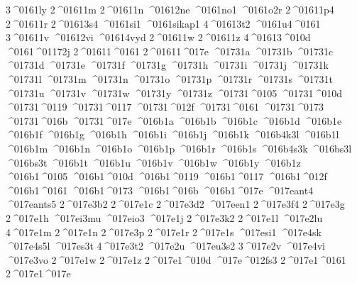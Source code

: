 {3^^^^0161ly
2^^^^01611m
2^^^^01611n
^^^^01612ne
^^^^0161no1
^^^^0161o2r
2^^^^01611p4
2^^^^01611r
2^^^^01613s4
^^^^0161si1
^^^^0161sikap1
4^^^^01613t2
^^^^0161u4^^^^0161
3^^^^01611v
^^^^01612vi
^^^^01614vyd
2^^^^01611w
2^^^^01611z
4^^^^01613^^^^010d
^^^^0161^^^^01172j
2^^^^01611^^^^0161
2^^^^01611^^^^017e
^^^^01731a
^^^^01731b
^^^^01731c
^^^^01731d
^^^^01731e
^^^^01731f
^^^^01731g
^^^^01731h
^^^^01731i
^^^^01731j
^^^^01731k
^^^^01731l
^^^^01731m
^^^^01731n
^^^^01731o
^^^^01731p
^^^^01731r
^^^^01731s
^^^^01731t
^^^^01731u
^^^^01731v
^^^^01731w
^^^^01731y
^^^^01731z
^^^^01731^^^^0105
^^^^01731^^^^010d
^^^^01731^^^^0119
^^^^01731^^^^0117
^^^^01731^^^^012f
^^^^01731^^^^0161
^^^^01731^^^^0173
^^^^01731^^^^016b
^^^^01731^^^^017e
^^^^016b1a
^^^^016b1b
^^^^016b1c
^^^^016b1d
^^^^016b1e
^^^^016b1f
^^^^016b1g
^^^^016b1h
^^^^016b1i
^^^^016b1j
^^^^016b1k
^^^^016b4k3l
^^^^016b1l
^^^^016b1m
^^^^016b1n
^^^^016b1o
^^^^016b1p
^^^^016b1r
^^^^016b1s
^^^^016b4s3k
^^^^016bs3l
^^^^016bs3t
^^^^016b1t
^^^^016b1u
^^^^016b1v
^^^^016b1w
^^^^016b1y
^^^^016b1z
^^^^016b1^^^^0105
^^^^016b1^^^^010d
^^^^016b1^^^^0119
^^^^016b1^^^^0117
^^^^016b1^^^^012f
^^^^016b1^^^^0161
^^^^016b1^^^^0173
^^^^016b1^^^^016b
^^^^016b1^^^^017e
^^^^017eant4
^^^^017eants5
2^^^^017e3b2
2^^^^017e1c
2^^^^017e3d2
^^^^017een1
2^^^^017e3f4
2^^^^017e3g
2^^^^017e1h
^^^^017ei3mu
^^^^017eio3
^^^^017e1j
2^^^^017e3k2
2^^^^017e1l
^^^^017e2lu
4^^^^017e1m
2^^^^017e1n
2^^^^017e3p
2^^^^017e1r
2^^^^017e1s
^^^^017esi1
^^^^017e4sk
^^^^017e4s5l
^^^^017es3t
4^^^^017e3t2
^^^^017e2u
^^^^017eu3s2
3^^^^017e2v
^^^^017e4vi
^^^^017e3vo
2^^^^017e1w
2^^^^017e1z
2^^^^017e1^^^^010d
^^^^017e^^^^012fs3
2^^^^017e1^^^^0161
2^^^^017e1^^^^017e
}